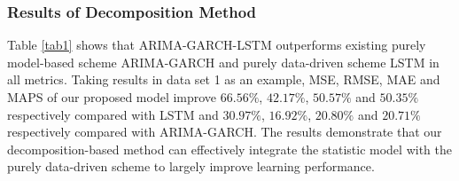 \subsubsection{Results of Decomposition Method}
Table \ref{tab1} shows that ARIMA-GARCH-LSTM  outperforms existing purely model-based scheme  ARIMA-GARCH and purely data-driven scheme LSTM  in all metrics. Taking results in data set 1 as an example, MSE, RMSE, MAE and MAPS of our proposed model improve $66.56\%$, $42.17\%$, $50.57\%$ and $50.35\%$ %
respectively compared with LSTM and $30.97\%$, $16.92\%$, $20.80\%$ and $20.71\%$ respectively compared with ARIMA-GARCH.    The results demonstrate that our decomposition-based method can effectively integrate the statistic model with the purely data-driven scheme to largely improve learning performance.






